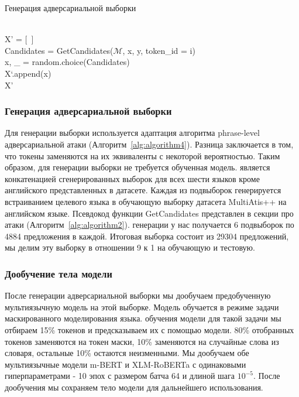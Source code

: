 \begin{algorithm}
    \caption{Генерация адверсариальной выборки}
    \begin{algorithmic}
         \\
        X' = [~]
                    \\
                    \ind\ind\ind Candidates = GetCandidates($\mathcal{M}$, x, y, token\_id = i)
                    \ind{}
                            \\
                            \ind\ind\ind\ind x, \_ = random.choice(Candidates)
                    \EndIf
                \EndFor \\
                \ind\ind X`.append(x)
            \EndFor
        \EndFor \\
        \Return X'
    \end{algorithmic}\label{alg:algorithm4}
\end{algorithm}

\subsubsection{Генерация адверсариальной выборки}
Для генерации выборки используется адаптация алгоритма phrase-level адверсариальной атаки (Алгоритм~\eqref{alg:algorithm4}).
Разница заключается в том, что токены заменяются на их эквиваленты с некоторой вероятностью.
Таким образом, для генерации выборки не требуется обученная модель.
 является конкатенацией сгенерированных выборок для всех шести языков кроме английского представленных в датасете.
Каждая из подвыборок генерируется встраиванием целевого языка в обучающую выборку датасета MultiAtis++ на английском языке.
Псевдокод функции GetCandidates представлен в секции про атаки (Алгоритм~\eqref{alg:algorithm2}).
 генерации у нас получается 6 подвыборок по 4884 предложения в каждой.
Итоговая выборка состоит из 29304 предложений, мы делим эту выборку в отношении 9 к 1 на обучающую и тестовую.

\subsubsection{Дообучение тела модели}
После генерации адверсариальной выборки мы дообучаем предобученную мультиязычную модель на этой выборке.
Модель обучается в режиме задачи маскированного моделирования языка.
 обучения модели для такой задачи мы отбираем 15\% токенов и предсказываем их с помощью модели.
80\% отобранных токенов заменяются на токен маски, 10\% заменяются на случайные слова из словаря, остальные 10\% остаются неизменными.
Мы дообучаем обе мультиязычные модели m-BERT и XLM-RoBERTa с одинаковыми гиперпараметрами - 10 эпох с размером батча 64 и длиной шага $10^{-5}$.
После дообучения мы сохраняем тело модели для дальнейшего использования.


